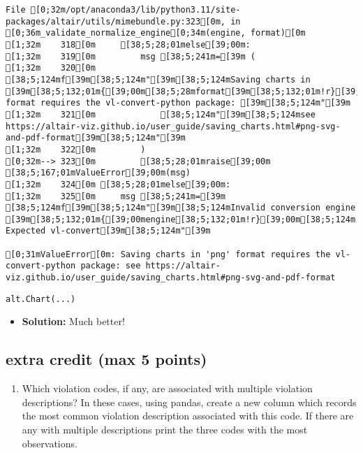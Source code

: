 \documentclass[
  letterpaper,
  DIV=11,
  numbers=noendperiod]{scrartcl}
\providecommand{\tightlist}{%
  \setlength{\itemsep}{0pt}\setlength{\parskip}{0pt}}\usepackage{longtable,booktabs,array}
\begin{document}
\begin{verbatim}
File [0;32m/opt/anaconda3/lib/python3.11/site-packages/altair/utils/mimebundle.py:323[0m, in [0;36m_validate_normalize_engine[0;34m(engine, format)[0m
[1;32m    318[0m     [38;5;28;01melse[39;00m:
[1;32m    319[0m         msg [38;5;241m=[39m (
[1;32m    320[0m             [38;5;124mf[39m[38;5;124m"[39m[38;5;124mSaving charts in [39m[38;5;132;01m{[39;00m[38;5;28mformat[39m[38;5;132;01m!r}[39;00m[38;5;124m format requires the vl-convert-python package: [39m[38;5;124m"[39m
[1;32m    321[0m             [38;5;124m"[39m[38;5;124msee https://altair-viz.github.io/user_guide/saving_charts.html#png-svg-and-pdf-format[39m[38;5;124m"[39m
[1;32m    322[0m         )
[0;32m--> 323[0m         [38;5;28;01mraise[39;00m [38;5;167;01mValueError[39;00m(msg)
[1;32m    324[0m [38;5;28;01melse[39;00m:
[1;32m    325[0m     msg [38;5;241m=[39m [38;5;124mf[39m[38;5;124m"[39m[38;5;124mInvalid conversion engine [39m[38;5;132;01m{[39;00mengine[38;5;132;01m!r}[39;00m[38;5;124m. Expected vl-convert[39m[38;5;124m"[39m

[0;31mValueError[0m: Saving charts in 'png' format requires the vl-convert-python package: see https://altair-viz.github.io/user_guide/saving_charts.html#png-svg-and-pdf-format
\end{verbatim}

\begin{verbatim}
alt.Chart(...)
\end{verbatim}

\begin{itemize}
\tightlist
\item
  \textbf{Solution:} Much better!
\end{itemize}

\subsection{extra credit (max 5
points)}\label{extra-credit-max-5-points}

\begin{enumerate}
\def\labelenumi{\arabic{enumi}.}
\tightlist
\item
  Which violation codes, if any, are associated with multiple violation
  descriptions? In these cases, using pandas, create a new column which
  records the most common violation description associated with this
  code. If there are any with multiple descriptions print the three
  codes with the most observations.
\end{enumerate}
\end{document}
